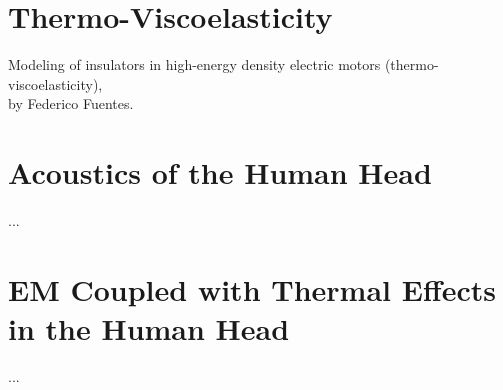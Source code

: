 \section{Thermo-Viscoelasticity}
\label{sec:visco-elasticity}

Modeling of insulators in high-energy density electric motors (thermo-viscoelasticity),\\
by Federico Fuentes.

\section{Acoustics of the Human Head}
\label{sec:human-head}

...

\section{EM Coupled with Thermal Effects in the Human Head}
\label{sec:human-head}

...


%


